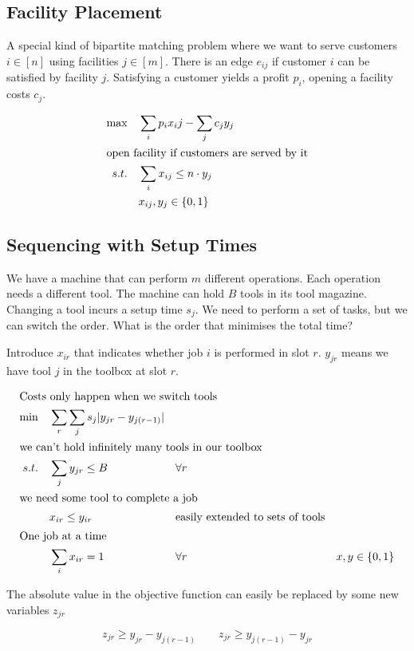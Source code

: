 \subsection{Facility Placement}

A special kind of bipartite matching problem where we want to serve customers $i\in [n]$ using facilities $j\in [m]$. There is an edge $e_{ij}$ if customer $i$ can be satisfied by facility $j$. Satisfying a customer yields a profit $p_i$, opening a facility costs $c_j$.

\begin{align*}
\max \quad & \sum_i p_i x_ij - \sum_{j} c_j y_j\\
\intertext{open facility if customers are served by it}
s.t. \quad & \sum_{i} x_{ij} \leq n\cdot y_j\\
	& x_{ij},y_j \in \{0,1\}
\end{align*}

\subsection{Sequencing with Setup Times}

We have a machine that can perform $m$ different operations. Each operation needs a different tool. The machine can hold $B$ tools in its tool magazine. Changing a tool incurs a setup time $s_j$. We need to perform a set of tasks, but we can switch the order. What is the order that minimises the total time?

Introduce $x_{ir}$ that indicates whether job $i$ is performed in slot $r$. $y_{jr}$ means we have tool $j$ in the toolbox at slot $r$.

\begin{align*}
\intertext{Costs only happen when we switch tools}
\min \quad & \sum_r\sum_j s_j|y_{jr}-y_{j(r-1)}|\\
\intertext{we can't hold infinitely many tools in our toolbox}
s.t.\quad	& \sum_j y_{jr} \leq B && \forall r\\
\intertext{we need some tool to complete a job}
	& x_{ir} \leq y_{ir} && \text{easily extended to sets of tools}\\
\intertext{One job at a time}
	& \sum_i x_{ir} = 1 && \forall r
	& x,y\in \{0,1\}
\end{align*}

The absolute value in the objective function can easily be replaced by some new variables $z_{jr}$

\[z_{jr} \geq y_{jr} - y_{j(r-1)} \qquad z_{jr} \geq y_{j(r-1)} - y_{jr}\]

